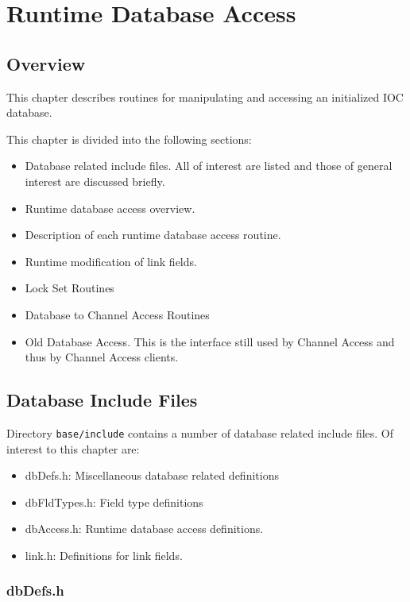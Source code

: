 \chapter{Runtime Database Access}

\section{Overview}

This chapter describes routines for manipulating and accessing an initialized IOC database.

This chapter is divided into the following sections:

\begin{itemize}\item Database related include files. All of interest are listed and those of general interest are discussed briefly.

\item Runtime database access overview.

\item Description of each runtime database access routine.

\item Runtime modification of link fields.

\item Lock Set Routines

\item Database to Channel Access Routines

\item Old Database Access. This is the interface still used by Channel Access and thus by Channel Access clients.

\end{itemize}\section{Database Include Files}

Directory \verb|base/include| contains a number of database related include files. Of interest to this chapter are:

\begin{itemize}\item {}dbDefs.h:  Miscellaneous database related definitions

\item {}dbFldTypes.h: Field type definitions

\item {}dbAccess.h: Runtime database access definitions.

\item {}link.h: Definitions for link fields.

\end{itemize}\subsection{dbDefs.h}


